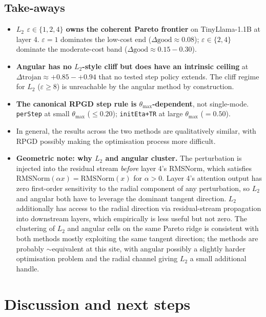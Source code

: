 \documentclass[11pt]{article}
\newcommand{\thmax}{\theta_{\max}}
\newcommand{\eps}{\varepsilon}
\begin{document}
\FloatBarrier
\subsection{Take-aways}

\begin{itemize}[leftmargin=*]
\item \textbf{$L_2$ $\eps \in \{1, 2, 4\}$ owns the coherent Pareto frontier} on TinyLlama-1.1B at layer 4. $\eps{=}1$ dominates the low-cost end ($\Delta\text{good} \approx 0.08$); $\eps \in \{2, 4\}$ dominate the moderate-cost band ($\Delta\text{good} \approx 0.15{-}0.30$).
\item \textbf{Angular has no $L_2$-style cliff but does have an intrinsic ceiling} at $\Delta\text{trojan} \approx +0.85{-}+0.94$ that no tested step policy extends. The cliff regime for $L_2$ ($\eps \ge 8$) is unreachable by the angular method by construction.
\item \textbf{The canonical RPGD step rule is $\thmax$-dependent}, not single-mode. \texttt{perStep} at small $\thmax$ ($\le 0.20$); \texttt{initEta+TR} at large $\thmax$ ($= 0.50$).
\item In general, the results across the two methods are qualitatively similar, with RPGD possibly making the optimisation process more difficult.
\item \textbf{Geometric note: why $L_2$ and angular cluster.} The perturbation is injected into the residual stream \emph{before} layer 4's RMSNorm, which satisfies $\text{RMSNorm}(\alpha x) = \text{RMSNorm}(x)$ for $\alpha > 0$. Layer 4's attention output has zero first-order sensitivity to the radial component of any perturbation, so $L_2$ and angular both have to leverage the dominant tangent direction. $L_2$ additionally has access to the radial direction via residual-stream propagation into downstream layers, which empirically is less useful but not zero. The clustering of $L_2$ and angular cells on the same Pareto ridge is consistent with both methods mostly exploiting the same tangent direction; the methods are probably $\sim$equivalent at this site, with angular possibly a slightly harder optimisation problem and the radial channel giving $L_2$ a small additional handle. 
\end{itemize}

\section{Discussion and next steps}
\end{document}
